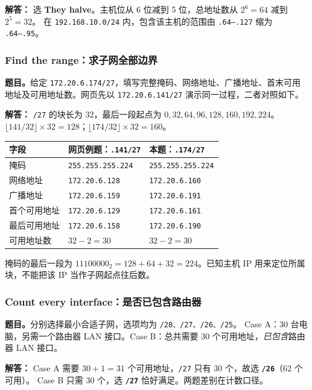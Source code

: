 \documentclass[11pt,a4paper,fontset=fandol]{ctexart}
\renewcommand{\exercisequestion}[2]{%
  \Needspace{5\baselineskip}%
  \subsubsection{#2}\label{exercise:#1}%
}
\renewenvironment{checkedsolution}
  {\par\nopagebreak[4]\textbf{解答：}\ignorespaces}
  {\par}
\begin{document}
\begin{checkedsolution}
选 \textbf{They halve}。主机位从 6 位减到 5 位，总地址数从 $2^6=64$ 减到 $2^5=32$。
在 \texttt{192.168.10.0/24} 内，包含该主机的范围由 \texttt{.64--.127} 缩为 \texttt{.64--.95}。
\end{checkedsolution}

\exercisequestion{SC2008-HW01-Q02}{Find the range：求子网全部边界}

\textbf{题目。}给定 \texttt{172.20.6.174/27}，填写完整掩码、网络地址、广播地址、首末可用地址及可用地址数。网页先以 \texttt{172.20.6.141/27} 演示同一过程，二者对照如下。

\begin{checkedsolution}
\texttt{/27} 的块长为 32，最后一段起点为 $0,32,64,96,128,160,192,224$。
$\lfloor141/32\rfloor\times32=128$；$\lfloor174/32\rfloor\times32=160$。
\begin{center}
\small
\begin{tabular}{@{}lll@{}}
\toprule
字段 & 网页例题：\texttt{.141/27} & 本题：\texttt{.174/27} \\
\midrule
掩码 & \texttt{255.255.255.224} & \texttt{255.255.255.224} \\
网络地址 & \texttt{172.20.6.128} & \texttt{172.20.6.160} \\
广播地址 & \texttt{172.20.6.159} & \texttt{172.20.6.191} \\
首个可用地址 & \texttt{172.20.6.129} & \texttt{172.20.6.161} \\
最后可用地址 & \texttt{172.20.6.158} & \texttt{172.20.6.190} \\
可用地址数 & $32-2=30$ & $32-2=30$ \\
\bottomrule
\end{tabular}
\end{center}
掩码的最后一段为 $11100000_2=128+64+32=224$。已知主机 IP 用来定位所属块，不能把该 IP 当作子网起点往后数。
\end{checkedsolution}

\exercisequestion{SC2008-HW01-Q03}{Count every interface：是否已包含路由器}

\textbf{题目。}分别选择最小合适子网，选项均为 \texttt{/28、/27、/26、/25}。
Case A：30 台电脑，另需一个路由器 LAN 接口。Case B：总共需要 30 个可用地址，\emph{已包含}路由器 LAN 接口。

\begin{checkedsolution}
Case A 需要 $30+1=31$ 个可用地址，\texttt{/27} 只有 30 个，故选 \textbf{\texttt{/26}}（62 个可用）。
Case B 只需 30 个，选 \textbf{\texttt{/27}} 恰好满足。两题差别在计数口径。
\end{checkedsolution}
\end{document}
